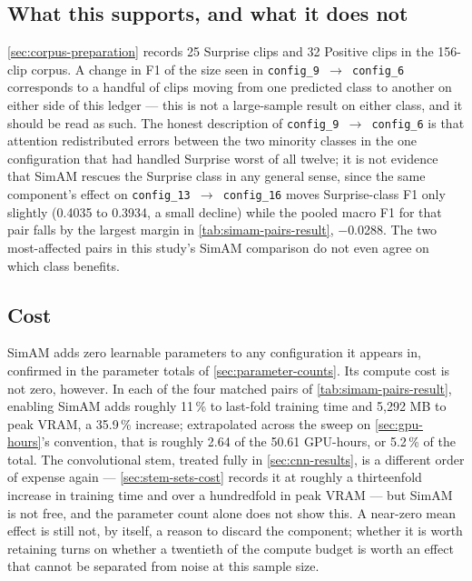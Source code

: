\subsection{What this supports, and what it does not}
\label{sec:simam-supports}

\autoref{sec:corpus-preparation} records 25 Surprise clips and 32 Positive clips in the 156-clip corpus. A change in F1 of the size seen in \texttt{config\_9 $\rightarrow$ config\_6} corresponds to a handful of clips moving from one predicted class to another on either side of this ledger --- this is not a large-sample result on either class, and it should be read as such. The honest description of \texttt{config\_9 $\rightarrow$ config\_6} is that attention redistributed errors between the two minority classes in the one configuration that had handled Surprise worst of all twelve; it is not evidence that SimAM rescues the Surprise class in any general sense, since the same component's effect on \texttt{config\_13 $\rightarrow$ config\_16} moves Surprise-class F1 only slightly (0.4035 to 0.3934, a small decline) while the pooled macro F1 for that pair falls by the largest margin in \autoref{tab:simam-pairs-result}, $-$0.0288. The two most-affected pairs in this study's SimAM comparison do not even agree on which class benefits.

\subsection{Cost}
\label{sec:simam-cost}

SimAM adds zero learnable parameters to any configuration it appears in, confirmed in the parameter totals of \autoref{sec:parameter-counts}. Its compute cost is not zero, however. In each of the four matched pairs of \autoref{tab:simam-pairs-result}, enabling SimAM adds roughly 11\,\% to last-fold training time and 5,292 MB to peak VRAM, a 35.9\,\% increase; extrapolated across the sweep on \autoref{sec:gpu-hours}'s convention, that is roughly 2.64 of the 50.61 GPU-hours, or 5.2\,\% of the total. The convolutional stem, treated fully in \autoref{sec:cnn-results}, is a different order of expense again --- \autoref{sec:stem-sets-cost} records it at roughly a thirteenfold increase in training time and over a hundredfold in peak VRAM --- but SimAM is not free, and the parameter count alone does not show this. A near-zero mean effect is still not, by itself, a reason to discard the component; whether it is worth retaining turns on whether a twentieth of the compute budget is worth an effect that cannot be separated from noise at this sample size.


